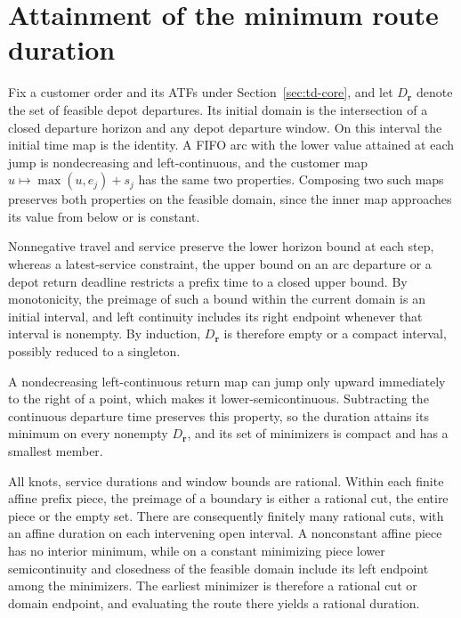 \section{Attainment of the minimum route duration}\label{app:td-attainment}

Fix a customer order and its ATFs under Section~\ref{sec:td-core}, and let $D_{\mathbf r}$ denote the set of feasible depot departures. Its initial domain is the intersection of a closed departure horizon and any depot departure window. On this interval the initial time map is the identity. A FIFO arc with the lower value attained at each jump is nondecreasing and left-continuous, and the customer map $u\mapsto\max(u,e_j)+s_j$ has the same two properties. Composing two such maps preserves both properties on the feasible domain, since the inner map approaches its value from below or is constant.

Nonnegative travel and service preserve the lower horizon bound at each step, whereas a latest-service constraint, the upper bound on an arc departure or a depot return deadline restricts a prefix time to a closed upper bound. By monotonicity, the preimage of such a bound within the current domain is an initial interval, and left continuity includes its right endpoint whenever that interval is nonempty. By induction, $D_{\mathbf r}$ is therefore empty or a compact interval, possibly reduced to a singleton.

A nondecreasing left-continuous return map can jump only upward immediately to the right of a point, which makes it lower-semicontinuous. Subtracting the continuous departure time preserves this property, so the duration attains its minimum on every nonempty $D_{\mathbf r}$, and its set of minimizers is compact and has a smallest member.

All knots, service durations and window bounds are rational. Within each finite affine prefix piece, the preimage of a boundary is either a rational cut, the entire piece or the empty set. There are consequently finitely many rational cuts, with an affine duration on each intervening open interval. A nonconstant affine piece has no interior minimum, while on a constant minimizing piece lower semicontinuity and closedness of the feasible domain include its left endpoint among the minimizers. The earliest minimizer is therefore a rational cut or domain endpoint, and evaluating the route there yields a rational duration.
